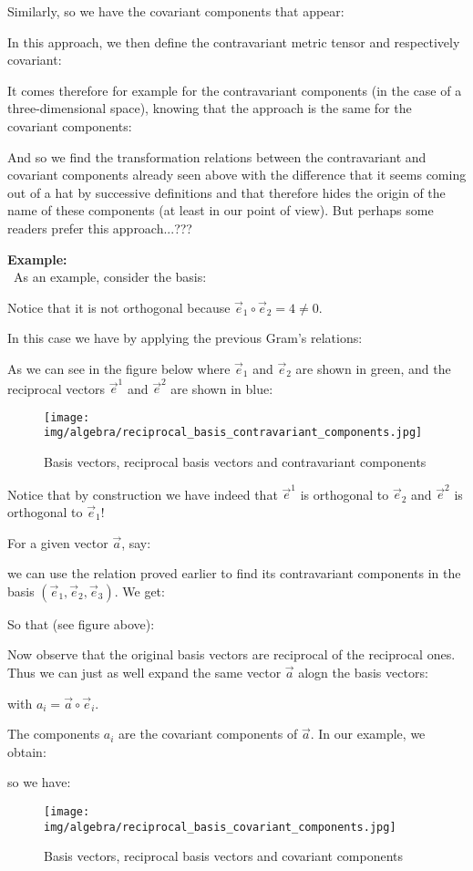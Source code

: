 	Similarly, so we have the covariant components that appear:
	
	In this approach, we then define the contravariant  metric tensor and respectively covariant:
	
	It comes therefore for example for the contravariant components (in the case of a three-dimensional space), knowing that the approach is the same for the covariant components:
	
	And so we find the transformation relations between the  contravariant and covariant components already seen above with the difference that it seems coming out of a hat by successive definitions and that therefore hides the origin of the name of these components (at least in our point of view). But perhaps some readers prefer this approach...???
	
	\begin{tcolorbox}[colframe=black,colback=white,sharp corners]
	\textbf{{\Large {}}Example:}\\\
	As an example, consider the basis:
	
	Notice that it is not orthogonal because $\vec{e}_1\circ \vec{e}_2=4\neq 0$.

	In this case we have by applying the previous Gram's relations:
	
	As we can see in the figure below where $\vec{e}_1$ and $\vec{e}_2$ are shown in green, and the reciprocal vectors  $\vec{e}^1$ and  $\vec{e}^2$ are shown in blue:\\
	\begin{figure}[H]
		\centering
		\texttt{[image: img/algebra/reciprocal\_basis\_contravariant\_components.jpg]}
		\caption[]{Basis vectors, reciprocal basis vectors and contravariant components}
	\end{figure}
	Notice that by construction we have indeed that $\vec{e}^1$ is orthogonal to $\vec{e}_2$ and $\vec{e}^2$ is orthogonal to $\vec{e}_1$!
	\end{tcolorbox}
	
	\begin{tcolorbox}[colframe=black,colback=white,sharp corners]
	For a given vector $\vec{a}$, say:
	
	we can use the relation proved earlier to find its contravariant components in the basis $(\vec{e}_1,\vec{e}_2,\vec{e}_3)$. We get:
	
	So that (see figure above):
	
	Now observe that the original basis vectors are reciprocal of the reciprocal ones. Thus we can just as well expand the same vector $\vec{a}$ alogn the basis vectors:
	
	with $a_i=\vec{a}\circ\vec{e}_i$.

	The components $a_i$ are the covariant components of $\vec{a}$. In our example, we obtain:
	
	so we have:
	
	\begin{figure}[H]
		\centering
		\texttt{[image: img/algebra/reciprocal\_basis\_covariant\_components.jpg]}
		\caption[]{Basis vectors, reciprocal basis vectors and covariant components}
	\end{figure}
	\end{tcolorbox}
	
